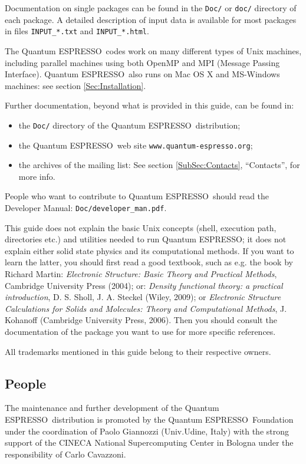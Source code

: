 \documentclass[12pt,a4paper]{article}
\def\qe{{\sc Quantum ESPRESSO}}
\begin{document}
Documentation on single packages can be found in the \texttt{Doc/} or
\texttt{doc/} directory of each package. A detailed description of input
data is available for most packages in files \texttt{INPUT\_*.txt} and
\texttt{INPUT\_*.html}.

The \qe\ codes work on many different types of Unix machines,
including parallel machines using both OpenMP and MPI
(Message Passing Interface).
\qe\ also runs on Mac OS X and MS-Windows machines:
see section \ref{Sec:Installation}.

Further documentation, beyond what is provided in this guide, can be found in:
\begin{itemize}
  \item the \texttt{Doc/} directory of the \qe\ distribution;
  \item the \qe\ web site \texttt{www.quantum-espresso.org};
  \item the archives of the  mailing list:
   See section \ref{SubSec:Contacts}, ``Contacts'', for more info.
\end{itemize}
People who want to contribute to \qe\ should read the
Developer Manual: \texttt{Doc/developer\_man.pdf}.

This guide does not explain the basic Unix concepts (shell, execution
path, directories etc.) and utilities needed to run \qe; it does not
explain either solid state physics and its computational methods.
If you want to learn the latter, you should first read a good textbook,
such as e.g. the book by Richard Martin:
{\em Electronic Structure: Basic Theory and Practical Methods},
Cambridge University Press (2004); or:
{\em Density functional theory: a practical introduction},
D. S. Sholl, J. A. Steckel (Wiley, 2009); or
{\em Electronic Structure Calculations for Solids and Molecules:
Theory and Computational Methods},
J. Kohanoff (Cambridge University Press, 2006). Then you should consult
the documentation of the package you want to use for more specific references.

All trademarks mentioned in this guide belong to their respective owners.

\subsection{People}

The maintenance and further development of the \qe\ distribution
is promoted by the \qe\ Foundation under the coordination of
Paolo Giannozzi (Univ.Udine, Italy) with the strong support
of the CINECA National Supercomputing Center in Bologna under
the responsibility of Carlo Cavazzoni.
\end{document}

